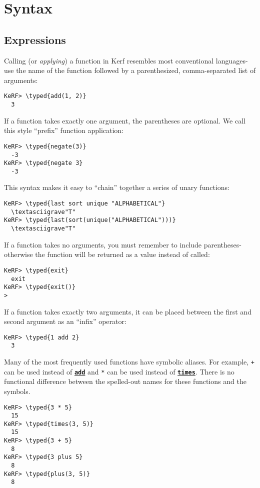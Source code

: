 \documentclass{article}
\newcommand{\typed}[1]{\textcolor{TealBlue}{#1}}
\newcommand{\primu}[2]{\hyperref[prim:#2]{\textbf{\texttt{#1}}}}
\newcommand{\prim}[1]{\primu{#1}{#1}}
\begin{document}
\pagebreak
\section {Syntax}

\subsection{Expressions}
Calling (or \emph{applying}) a function in Kerf resembles most conventional languages- use the name of the function followed by a parenthesized, comma-separated list of arguments:
\begin{Verbatim}
KeRF> \typed{add(1, 2)}
  3
\end{Verbatim}

If a function takes exactly one argument, the parentheses are optional. We call this style ``prefix'' function application:
\begin{Verbatim}
KeRF> \typed{negate(3)}
  -3
KeRF> \typed{negate 3}
  -3
\end{Verbatim}

This syntax makes it easy to ``chain'' together a series of unary functions:
\begin{Verbatim}
KeRF> \typed{last sort unique "ALPHABETICAL"}
  \textasciigrave"T"
KeRF> \typed{last(sort(unique("ALPHABETICAL")))}
  \textasciigrave"T"
\end{Verbatim}

If a function takes no arguments, you must remember to include parentheses- otherwise the function will be returned as a value instead of called:
\begin{Verbatim}
KeRF> \typed{exit}
  exit
KeRF> \typed{exit()}
>
\end{Verbatim}

If a function takes exactly two arguments, it can be placed between the first and second argument as an ``infix'' operator:
\begin{Verbatim}
KeRF> \typed{1 add 2}
  3
\end{Verbatim}

Many of the most frequently used functions have symbolic aliases. For example, \texttt{+} can be used instead of \prim{add} and \texttt{*} can be used instead of \prim{times}. There is no functional difference between the spelled-out names for these functions and the symbols.
\begin{Verbatim}
KeRF> \typed{3 * 5}
  15
KeRF> \typed{times(3, 5)}
  15
KeRF> \typed{3 + 5}
  8
KeRF> \typed{3 plus 5}
  8
KeRF> \typed{plus(3, 5)}
  8
\end{Verbatim}
\end{document}
